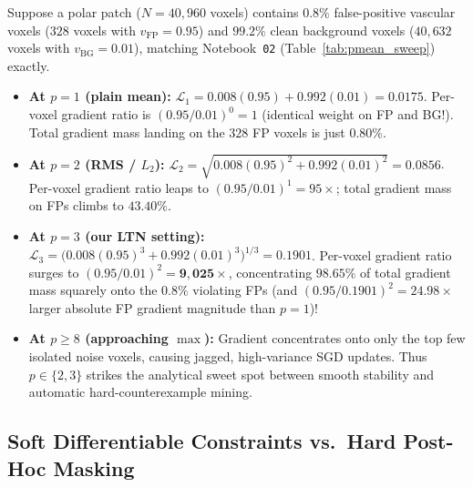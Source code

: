 \documentclass[10pt,a4paper]{article}
\renewcommand{\_}{\origunderscore\allowbreak}
\begin{document}
\begin{tcolorbox}[enhanced, colback=lightgray, colframe=kiwigreen!80!black, arc=2pt, left=7pt, right=7pt, top=5pt, bottom=5pt,
  title={\textbf{Worked Numerical Example: Hard-Counterexample Mining at $p = 3$}}]
Suppose a polar patch ($N = 40{,}960$ voxels) contains $0.8\%$ false-positive vascular voxels ($328$ voxels with $v_{\text{FP}} = 0.95$) and $99.2\%$ clean background voxels ($40{,}632$ voxels with $v_{\text{BG}} = 0.01$), matching Notebook~\texttt{02} (Table~\ref{tab:pmean_sweep}) exactly.
\begin{itemize}[itemsep=1.5pt, topsep=2pt]
    \item \textbf{At $p = 1$ (plain mean):} $\mathcal{L}_1 = 0.008(0.95) + 0.992(0.01) = 0.0175$. Per-voxel gradient ratio is $(0.95/0.01)^0 = 1$ (identical weight on FP and BG!). Total gradient mass landing on the $328$ FP voxels is just $0.80\%$.
    \item \textbf{At $p = 2$ (RMS / $L_2$):} $\mathcal{L}_2 = \sqrt{0.008(0.95)^2 + 0.992(0.01)^2} = 0.0856$. Per-voxel gradient ratio leaps to $(0.95/0.01)^1 = 95\times$; total gradient mass on FPs climbs to $43.40\%$.
    \item \textbf{At $p = 3$ (our LTN setting):} $\mathcal{L}_3 = \bigl(0.008(0.95)^3 + 0.992(0.01)^3\bigr)^{1/3} = 0.1901$. Per-voxel gradient ratio surges to $(0.95/0.01)^2 = \mathbf{9{,}025\times}$, concentrating $\mathbf{98.65\%}$ of total gradient mass squarely onto the $0.8\%$ violating FPs (and $(0.95/0.1901)^2 = \mathbf{24.98\times}$ larger absolute FP gradient magnitude than $p=1$)!
    \item \textbf{At $p \ge 8$ (approaching $\max$):} Gradient concentrates onto only the top few isolated noise voxels, causing jagged, high-variance SGD updates. Thus $p \in \{2, 3\}$ strikes the analytical sweet spot between smooth stability and automatic hard-counterexample mining.
\end{itemize}
\end{tcolorbox}

\subsection{Soft Differentiable Constraints vs.\ Hard Post-Hoc Masking}
\end{document}
